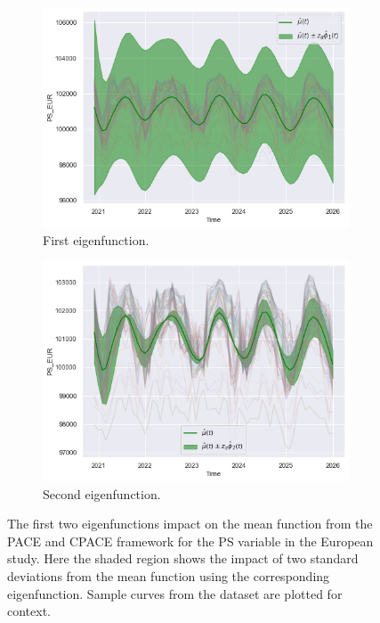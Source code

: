 \begin{figure}
	\centering
	\begin{subfigure}[b]{0.45\textwidth}
		\includegraphics[width=\textwidth]{phi_1_ps_eur}
		\caption{First eigenfunction.}
		\label{fig:phi_1_ps_eur}
	\end{subfigure}
	\hfill        
	\begin{subfigure}[b]{0.45\textwidth}
		\includegraphics[width=\textwidth]{phi_2_ps_eur}
		\caption{Second eigenfunction.}
		\label{fig:phi_2_ps_eur}
	\end{subfigure}
	\caption{The first two eigenfunctions impact on the mean function from the PACE and CPACE framework for the PS variable in the European study. Here the shaded region shows the impact of two standard deviations from the mean function using the corresponding eigenfunction. Sample curves from the dataset are plotted for context.}
	\label{fig:phi_ps_eur}
\end{figure}

